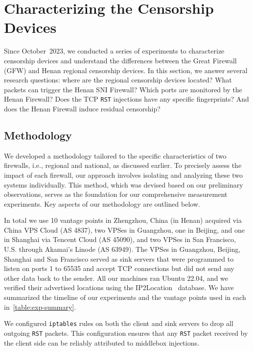 \documentclass[conference,compsoc]{IEEEtran}
\begin{document}
\section{Characterizing the Censorship Devices}
\label{sec:characterization}

Since October~2023,
we conducted a series of experiments to characterize censorship devices
and understand the differences between the Great Firewall (GFW)
and Henan regional censorship devices.
In this section, we answer several research questions:
where are the regional censorship devices located?
What packets can trigger the Henan SNI Firewall?
Which ports are monitored by the Henan Firewall?
Does the TCP \texttt{RST} injections have any specific fingerprints?
And does the Henan Firewall induce residual censorship?

\subsection{Methodology}
\label{sec:methodology}

We developed a methodology tailored to the specific characteristics of two firewalls, i.e., regional and national, as discussed earlier. To precisely assess the impact of each firewall, our approach involves isolating and analyzing these two systems individually. This method, which was devised based on our preliminary observations, serves as the foundation for our comprehensive measurement experiments. Key aspects of our methodology are outlined below.

In total we use 10 vantage points in Zhengzhou, China (in Henan) acquired via China VPS Cloud (AS 4837),
two VPSes in Guangzhou, one in Beijing, and one in Shanghai via Tencent Cloud (AS 45090),
and two VPSes in San Francisco, U.S. through Akamai's Linode (AS 63949).
The VPSes in Guangzhou, Beijing, Shanghai and San Francisco served as sink servers that were programmed
to listen on ports 1 to 65535 and accept TCP connections but did not send any other data back to the sender.
All our machines ran Ubuntu 22.04, and we verified their advertised locations using the IP2Location~\cite{ip2location} database.
We have summarized the timeline of our experiments and the vantage points used in each in~\autoref{table:exp-summary}.

We configured \texttt{iptables} rules on both the client and sink servers to drop all outgoing \texttt{RST} packets.
This configuration ensures that any \texttt{RST} packet received by the client side can be reliably attributed to middlebox injections.
\end{document}
